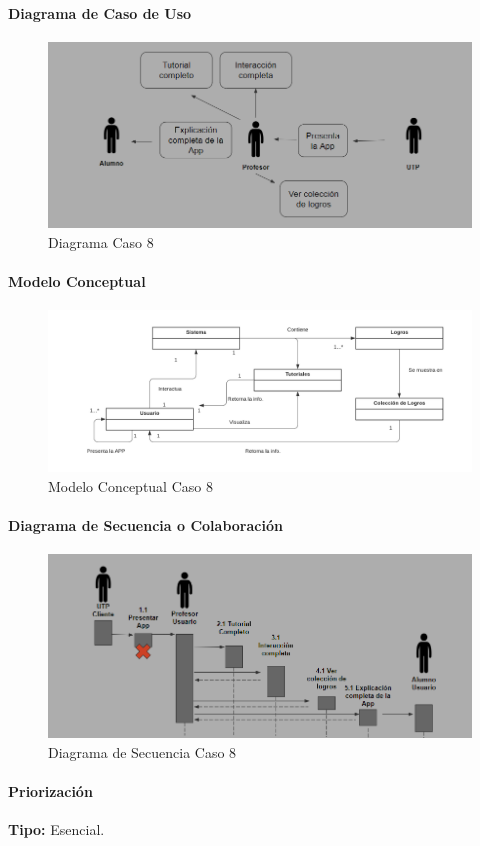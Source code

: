 \paragraph{Diagrama de Caso de Uso}

\begin{figure}[H]
\centerline{\includegraphics[width=15cm]{imgs/CasoUso_8.PNG}}
\caption{Diagrama Caso 8}
\label{fig_8_1}
\end{figure}

\paragraph{Modelo Conceptual}

\begin{figure}[H]
\centerline{\includegraphics[width=15cm]{imgs/ModeloConceptualCaso_8_3.png}}
\caption{Modelo Conceptual Caso 8}
\label{fig_8_2}
\end{figure}

\paragraph{Diagrama de Secuencia o Colaboración}

\begin{figure}[H]
\centerline{\includegraphics[width=15cm]{imgs/CasoUso_8_2.PNG}}
\caption{Diagrama de Secuencia Caso 8}
\label{fig_8_3}
\end{figure}

\paragraph{Priorización}
{\textbf {Tipo:}}
Esencial.